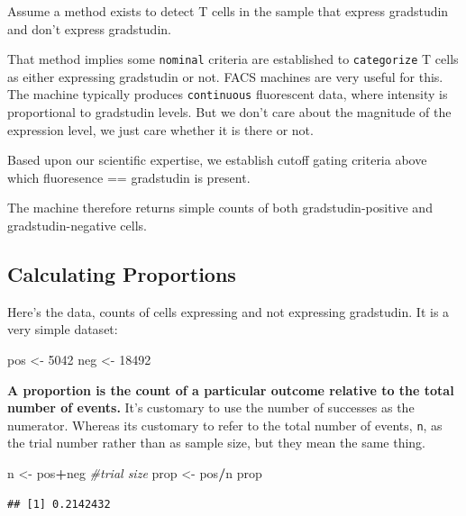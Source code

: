 \documentclass[]{book}
\newenvironment{Shaded}{\begin{snugshade}}{\end{snugshade}}
\newcommand{\CommentTok}[1]{\textcolor[rgb]{0.56,0.35,0.01}{\textit{#1}}}
\newcommand{\DecValTok}[1]{\textcolor[rgb]{0.00,0.00,0.81}{#1}}
\newcommand{\NormalTok}[1]{#1}
\newcommand{\OperatorTok}[1]{\textcolor[rgb]{0.81,0.36,0.00}{\textbf{#1}}}
\newcommand{\StringTok}[1]{\textcolor[rgb]{0.31,0.60,0.02}{#1}}
\begin{document}
Assume a method exists to detect T cells in the sample that express gradstudin and don't express gradstudin.

That method implies some \texttt{nominal} criteria are established to \texttt{categorize} T cells as either expressing gradstudin or not. FACS machines are very useful for this. The machine typically produces \texttt{continuous} fluorescent data, where intensity is proportional to gradstudin levels. But we don't care about the magnitude of the expression level, we just care whether it is there or not.

Based upon our scientific expertise, we establish cutoff gating criteria above which fluoresence == gradstudin is present.

The machine therefore returns simple counts of both gradstudin-positive and gradstudin-negative cells.

\hypertarget{calculating-proportions}{%
\subsection{Calculating Proportions}\label{calculating-proportions}}

Here's the data, counts of cells expressing and not expressing gradstudin. It is a very simple dataset:

\begin{Shaded}
\begin{Highlighting}[]
\NormalTok{pos <-}\StringTok{ }\DecValTok{5042}
\NormalTok{neg <-}\StringTok{ }\DecValTok{18492}
\end{Highlighting}
\end{Shaded}

\textbf{A proportion is the count of a particular outcome relative to the total number of events.} It's customary to use the number of successes as the numerator. Whereas its customary to refer to the total number of events, \texttt{n}, as the trial number rather than as sample size, but they mean the same thing.

\begin{Shaded}
\begin{Highlighting}[]
\NormalTok{n <-}\StringTok{ }\NormalTok{pos}\OperatorTok{+}\NormalTok{neg }\CommentTok{#trial size}
\NormalTok{prop <-}\StringTok{ }\NormalTok{pos}\OperatorTok{/}\NormalTok{n}
\NormalTok{prop}
\end{Highlighting}
\end{Shaded}

\begin{verbatim}
## [1] 0.2142432
\end{verbatim}
\end{document}
